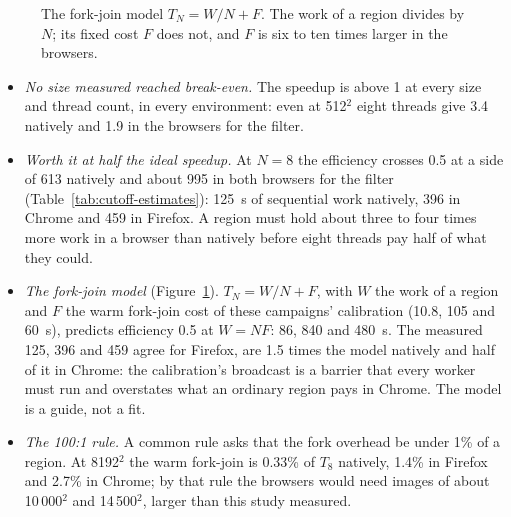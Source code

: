 


\begin{figure}[tbp]
\centering
{}
\caption{The fork-join model $T_N = W/N + F$. The work of a region divides
by $N$; its fixed cost $F$ does not, and $F$ is six to ten times larger in
the browsers.}
\label{fig:forkjoin-model}
\end{figure}

\begin{itemize}[leftmargin=1.5em]
\item \emph{No size measured reached break-even.} The speedup is above 1 at
every size and thread count, in every environment: even at 512$^2$ eight
threads give 3.4 natively and 1.9 in the browsers for the filter.
\item \emph{Worth it at half the ideal speedup.} At $N=8$ the efficiency
crosses 0.5 at a side of 613 natively and about 995 in both browsers for
the filter (Table~\ref{tab:cutoff-estimates}): 125~\textmu s of sequential
work natively, 396 in Chrome and 459 in Firefox. A region must hold about
three to four times more work in a browser than natively before eight
threads pay half of what they could.
\item \emph{The fork-join model} (Figure~\ref{fig:forkjoin-model}). $T_N = W/N + F$, with $W$ the work of a
region and $F$ the warm fork-join cost of these campaigns' calibration
(10.8, 105 and 60~\textmu s), predicts efficiency 0.5 at $W = NF$: 86, 840
and 480~\textmu s. The measured 125, 396 and 459 agree for Firefox, are 1.5
times the model natively and half of it in Chrome: the calibration's
broadcast is a barrier that every worker must run and overstates what an
ordinary region pays in Chrome. The model is a guide, not a fit.
\item \emph{The 100:1 rule.} A common rule asks that the fork overhead be
under 1\% of a region. At 8192$^2$ the warm fork-join is 0.33\% of $T_8$
natively, 1.4\% in Firefox and 2.7\% in Chrome; by that rule the browsers
would need images of about 10\,000$^2$ and 14\,500$^2$, larger than this
study measured.
\end{itemize}

